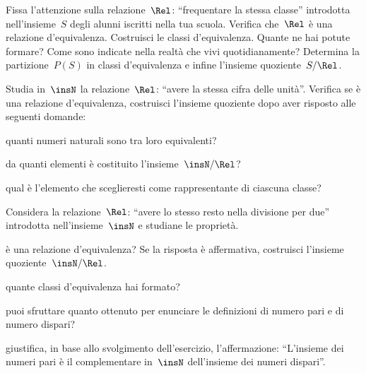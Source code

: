 \begin{multicols}{2}
\begin{esercizio}
\label{ese:7.27}
Fissa l'attenzione sulla relazione~$\Rel$: ``frequentare la stessa classe'' introdotta nell'insieme~$S$ degli alunni iscritti nella tua scuola.
Verifica che~$\Rel$ è una relazione d'equivalenza. Costruisci le classi d'equivalenza. Quante ne hai potute formare? Come sono indicate nella
realtà che vivi quotidianamente? Determina la partizione~$P(S)$ in classi d'equivalenza e infine l'insieme quoziente~$S/\Rel$.
\end{esercizio}

\begin{esercizio}
\label{ese:7.28}
Studia in~$\insN$ la relazione~$\Rel$: ``avere la stessa cifra delle unità''. Verifica se è una relazione
d'equivalenza, costruisci l'insieme quoziente dopo aver risposto alle seguenti domande:\vspace{-1ex}
\begin{itemize*}
\item quanti numeri naturali sono tra loro equivalenti?
\item da quanti elementi è costituito l'insieme~$\insN/\Rel$?
\item qual è l'elemento che sceglieresti come rappresentante di ciascuna classe?
\end{itemize*}
\end{esercizio}

\begin{esercizio}
\label{ese:7.29}
Considera la relazione~$\Rel$: ``avere lo stesso resto nella divisione per due'' introdotta nell'insieme~$\insN$ e studiane le proprietà.
\begin{itemize*}
\item è una relazione d'equivalenza? Se la risposta è affermativa, costruisci l'insieme quoziente~$\insN/\Rel$.
\item quante classi d'equivalenza hai formato?
\item puoi sfruttare quanto ottenuto per enunciare le definizioni di numero pari e di numero dispari?
\item giustifica, in base allo svolgimento dell'esercizio, l'affermazione: ``L'insieme dei numeri pari è il
complementare in~$\insN$ dell'insieme dei numeri dispari''.
\end{itemize*}
\end{esercizio}


\end{multicols}
